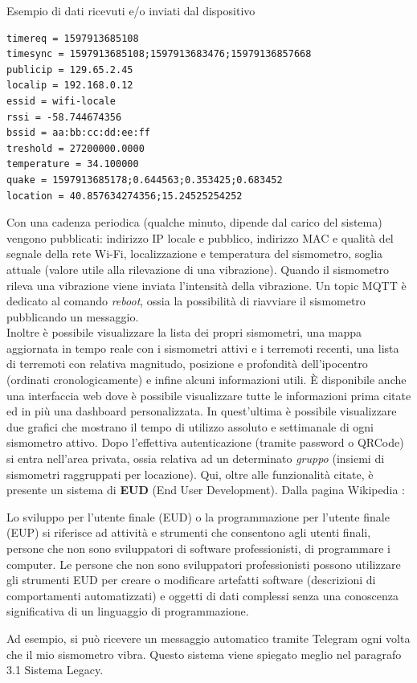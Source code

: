 \documentclass[a4paper,10pt]{memoir}
\begin{document}
\begin{center}
Esempio di dati ricevuti e/o inviati dal dispositivo
\end{center}
\begin{lstlisting}[numbers=none]
timereq = 1597913685108
timesync = 1597913685108;1597913683476;15979136857668
publicip = 129.65.2.45
localip = 192.168.0.12
essid = wifi-locale
rssi = -58.744674356
bssid = aa:bb:cc:dd:ee:ff
treshold = 27200000.0000
temperature = 34.100000
quake = 1597913685178;0.644563;0.353425;0.683452
location = 40.857634274356;15.24525254252
\end{lstlisting}
Con una cadenza periodica (qualche minuto, dipende dal carico del sistema) vengono pubblicati: indirizzo IP locale e pubblico, indirizzo MAC e qualità del segnale della rete Wi-Fi, localizzazione e temperatura del sismometro, soglia attuale (valore utile alla rilevazione di una vibrazione).
Quando il sismometro rileva una vibrazione viene inviata l'intensità della vibrazione.
Un topic MQTT è dedicato al comando \textit{reboot}, ossia la possibilità di riavviare il sismometro pubblicando un messaggio.\\
Inoltre è possibile visualizzare la lista dei propri sismometri, una mappa aggiornata in tempo reale con i sismometri attivi e i terremoti recenti, una lista di terremoti con relativa magnitudo, posizione e profondità dell'ipocentro (ordinati cronologicamente) e infine alcuni informazioni utili.
È disponibile anche una interfaccia web dove è possibile visualizzare tutte le informazioni prima citate ed in più una dashboard personalizzata.
In quest'ultima è possibile visualizzare due grafici che mostrano il tempo di utilizzo assoluto e settimanale di ogni sismometro attivo.
Dopo l'effettiva autenticazione (tramite password o QRCode) si entra nell'area privata, ossia relativa ad un determinato \textit{gruppo} (insiemi di sismometri raggruppati per locazione).
Qui, oltre alle funzionalità citate, è presente un sistema di \textbf{EUD} (End User Development).
Dalla pagina Wikipedia \cite{wikieud}:
\begin{quoting}[font=itshape, begintext={``}, endtext={``}]
Lo sviluppo per l'utente finale (EUD) o la programmazione per l'utente finale (EUP) si riferisce ad attività e strumenti che consentono agli utenti finali, persone che non sono sviluppatori di software professionisti, di programmare i computer. Le persone che non sono sviluppatori professionisti possono utilizzare gli strumenti EUD per creare o modificare artefatti software (descrizioni di comportamenti automatizzati) e oggetti di dati complessi senza una conoscenza significativa di un linguaggio di programmazione.
\end{quoting}
Ad esempio, si può ricevere un messaggio automatico tramite Telegram ogni volta che il mio sismometro vibra. Questo sistema viene spiegato meglio nel paragrafo 3.1 Sistema Legacy.
\end{document}
